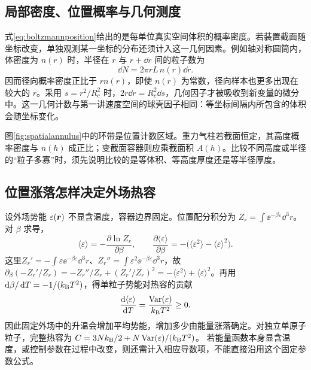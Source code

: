 \subsection{局部密度、位置概率与几何测度}
\label{th:spatialmeasure}
式\eqref{eq:boltzmannposition}给出的是每单位真实空间体积的概率密度。若装置截面随坐标改变，单独观测某一坐标的分布还须计入这一几何因素。例如轴对称圆筒内，体密度为 $n(r)$ 时，半径在 $r$ 与 $r+\dd r$ 间的粒子数为
\[
 \dd N=2\pi rL\,n(r)\dd r.
\]
因而径向概率密度正比于 $r n(r)$，即使 $n(r)$ 为常数，径向样本也更多出现在较大的 $r$。采用 $s=r^2/R_c^2$ 时，$2r\dd r=R_c^2\dd s$，几何因子才被吸收到新变量的微分中。这一几何计数与第一讲速度空间的球壳因子相同：等坐标间隔内所包含的体积会随坐标变化。

图\ref{fig:spatialannulus}中的环带是位置计数区域。重力气柱若截面恒定，其高度概率密度与 $n(h)$ 成正比；变截面容器则应乘截面积 $A(h)$。比较不同高度或半径的“粒子多寡”时，须先说明比较的是等体积、等高度厚度还是等半径厚度。

\subsection{位置涨落怎样决定外场热容}
设外场势能 $\varepsilon(\bm{r})$ 不显含温度，容器边界固定。位置配分积分为 $Z_r=\int\ee^{-\beta\varepsilon}\dd^3r$。对 $\beta$ 求导，
\[
 \langle\varepsilon\rangle=-\frac{\partial\ln Z_r}{\partial\beta},
 \qquad
 \frac{\partial\langle\varepsilon\rangle}{\partial\beta}
 =-\bigl(\langle\varepsilon^2\rangle-\langle\varepsilon\rangle^2\bigr).
\]
这里$Z_r'=-\int\varepsilon\ee^{-\beta\varepsilon}\dd^3r$、$Z_r''=\int\varepsilon^2\ee^{-\beta\varepsilon}\dd^3r$，故$\partial_\beta(-Z_r'/Z_r)=-Z_r''/Z_r+(Z_r'/Z_r)^2=-\langle\varepsilon^2\rangle+\langle\varepsilon\rangle^2$。再用$\mathop{}\!\mathrm d\beta/\mathop{}\!\mathrm d T=-1/(k_{\mathrm B} T^2)$，得单粒子势能对热容的贡献
\[
 \frac{\mathop{}\!\mathrm d\langle\varepsilon\rangle}{\mathop{}\!\mathrm d T}
 =\frac{\operatorname{Var}(\varepsilon)}{k_{\mathrm B} T^2}\ge0.
\]
因此固定外场中的升温会增加平均势能，增加多少由能量涨落确定。对独立单原子粒子，完整热容为
$C=3Nk_{\mathrm B}/2+N\operatorname{Var}(\varepsilon)/(k_{\mathrm B} T^2)$。
若能量函数本身显含温度，或控制参数在过程中改变，则还需计入相应导数项，不能直接沿用这个固定参数公式。

